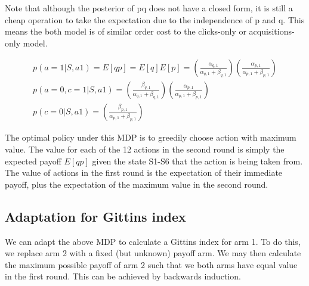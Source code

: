 \documentclass[12pt]{article}
\begin{document}
Note that although the posterior of pq does not have a closed form, it is still a cheap operation to take the expectation due to the independence of p and q. This means the both model is of similar order cost to the clicks-only or acquisitions-only model.

\begin{align}
	p(a=1|S,a1) = E[qp] = E[q]E[p] = 
		\left( \frac{ \alpha_{q,1} }{ \alpha_{q,1} + \beta_{q,1} } \right)
		\left( \frac{ \alpha_{p,1} }{ \alpha_{p,1} + \beta_{p,1} } \right) \\
	p(a=0,c=1|S,a1) = 
		\left( \frac{ \beta_{q,1} }{ \alpha_{q,1} + \beta_{q,1} } \right)
		\left( \frac{ \alpha_{p,1} }{ \alpha_{p,1} + \beta_{p,1} } \right) \\
	p(c=0|S,a1) = 
		\left( \frac{ \beta_{p,1} }{ \alpha_{p,1} + \beta_{p,1} } \right) 
\end{align}	

The optimal policy under this MDP is to greedily choose action with maximum value. The value for each of the 12 actions in the second round is simply the expected payoff $E[qp]$ given the state S1-S6 that the action is being taken from. The value of actions in the first round is the expectation of their immediate payoff, plus the expectation of the maximum value in the second round.

\subsection{Adaptation for Gittins index}

We can adapt the above MDP to calculate a Gittins index for arm 1. To do this, we replace arm 2 with a fixed (but unknown) payoff arm. We may then calculate the maximum possible payoff of arm 2 such that we both arms have equal value in the first round. This can be achieved by backwards induction.

{}

\end{document}
